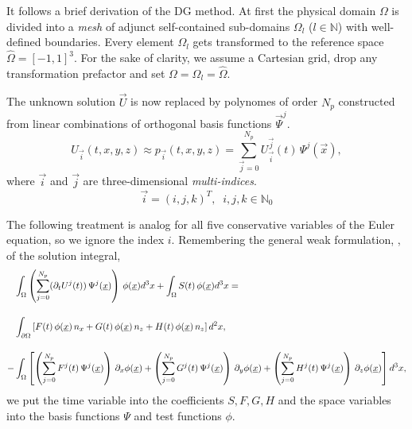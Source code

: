 
It follows a brief derivation of the DG method.  At first the physical domain
$\Omega$ is divided into a \emph{mesh} of adjunct self-contained sub-domains
$\Omega_l$ ($l \in \mathbb{N}$) with well-defined boundaries. Every
element $\Omega_l$ gets transformed to the reference space $\hat{\Omega} =
[-1,1]^3$. For the sake of clarity, we assume a Cartesian grid, drop any
transformation prefactor and set $\Omega = \Omega_l = \hat{\Omega}$.

The unknown solution $\vec{U}$ is now replaced by polynomes of order $N_p$
constructed from linear combinations of orthogonal basis functions
$\vec{\Psi}^j$.
\begin{equation}
    U_{\vec{i}}(t,x,y,z) \approx p_{\vec{i}}(t,x,y,z) = \sum^{N_p}_{\vec{j}=0} U^{\vec{j}}_{\vec{i}}(t) \, \Psi^j(\vec{x}),
\end{equation}
where $\vec{i}$ and $\vec{j}$ are three-dimensional \emph{multi-indices}.
\begin{equation}
    \vec{i} = (i,j,k)^T, \;\; i,j,k \in \mathbb{N}_0
\end{equation}

The following treatment is analog for all five conservative variables of the
Euler equation, so we ignore the index $i$. Remembering the general weak
formulation, , of the solution integral,
\begin{align}
\label{eqn:weak-formulation-galerkin}
    &\int_\Omega \left(\sum^{N_p}_{j=0} (\partial_t U^j(t)) \, \Psi^j(\vec{x})\right)\,\phi(\vec{x}) d^3x 
        + \int_\Omega S(t) \, \phi(\vec{x}) d^3x = \nonumber \br
         &\int_{\partial\Omega} \left[F(t)\,\phi(\vec{x})\,n_x + G(t)\,\phi(\vec{x})\,n_z + H(t)\,\phi(\vec{x})\,n_z \right] d^2x, \br
        -&\int_\Omega \left[
              \left(\sum^{N_p}_{j=0} F^j(t)\,\Psi^j(\vec{x})\right)\,\partial_x \phi(\vec{x}) 
            + \left(\sum^{N_p}_{j=0} G^j(t)\,\Psi^j(\vec{x})\right)\,\partial_y \phi(\vec{x})
            + \left(\sum^{N_p}_{j=0} H^j(t)\,\Psi^j(\vec{x})\right)\,\partial_z \phi(\vec{x}) \right] d^3x, \nonumber
\end{align}
we put the time variable into the coefficients $S,F,G,H$ and the space
variables into the basis functions $\Psi$ and test functions $\phi$.

